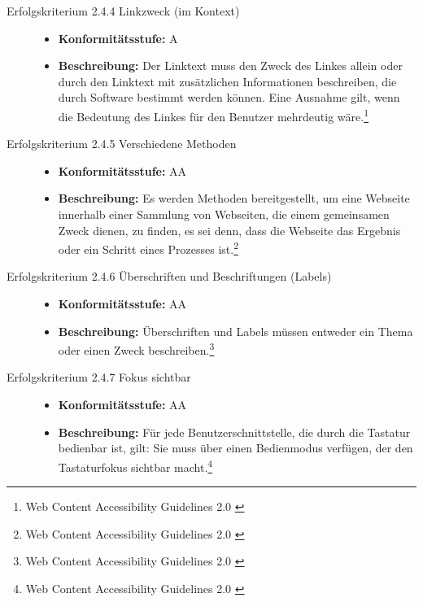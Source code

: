 \begin{description}
\begin{description}
		\item[Erfolgskriterium 2.4.4 Linkzweck (im Kontext)]\hfill
		\begin{itemize}
			\item \textbf{Konformitätsstufe:} A
			\item \textbf{Beschreibung:} Der Linktext muss den Zweck des Linkes allein oder durch den Linktext mit zusätzlichen 
			Informationen beschreiben, die durch Software bestimmt werden können. Eine Ausnahme gilt, wenn die Bedeutung des Linkes für den Benutzer mehrdeutig 
			wäre.\footnote{Web Content Accessibility Guidelines 2.0 \cite{WCAG2.0}}
		\end{itemize}
		
		\item[Erfolgskriterium 2.4.5 Verschiedene Methoden]\hfill
		\begin{itemize}
			\item \textbf{Konformitätsstufe:} AA
			\item \textbf{Beschreibung:} Es werden Methoden bereitgestellt, um eine Webseite innerhalb einer Sammlung von Webseiten, die einem 
			gemeinsamen Zweck dienen, zu finden, es sei denn, dass die Webseite das Ergebnis oder ein Schritt eines Prozesses 
			ist.\footnote{Web Content Accessibility Guidelines 2.0 \cite{WCAG2.0}}
		\end{itemize}
		
		\item[Erfolgskriterium 2.4.6 Überschriften und Beschriftungen (Labels)]\hfill
		\begin{itemize}
			\item \textbf{Konformitätsstufe:} AA
			\item \textbf{Beschreibung:} Überschriften und Labels müssen entweder ein Thema oder einen Zweck beschreiben.\footnote{Web Content Accessibility Guidelines 2.0 \cite{WCAG2.0}}
		\end{itemize}
		
		\item[Erfolgskriterium 2.4.7 Fokus sichtbar]\hfill
		\begin{itemize}
			\item \textbf{Konformitätsstufe:} AA
			\item \textbf{Beschreibung:} Für jede Benutzerschnittstelle, die durch die Tastatur bedienbar ist, gilt: Sie muss über einen Bedienmodus
			verfügen, der den Tastaturfokus sichtbar macht.\footnote{Web Content Accessibility Guidelines 2.0 \cite{WCAG2.0}}
		\end{itemize}
		

\end{description}
\end{description}

